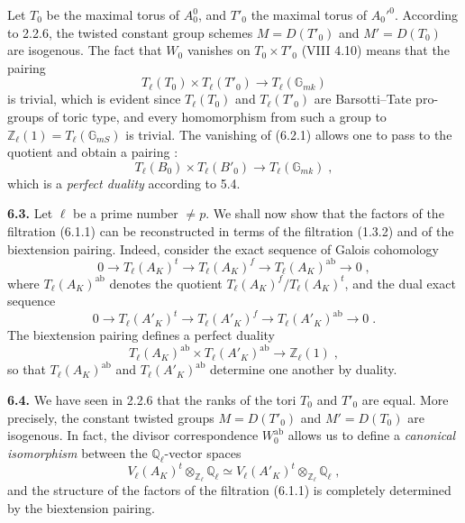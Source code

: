 \documentclass[11pt]{article}
\newcommand{\ZZ}{\mathbb Z}
\newcommand{\QQ}{\mathbb Q}
\newcommand{\GG}{\mathbb G}
\newcommand{\Tl}{T_{\ell}}
\newcommand{\ab}{\mathrm{ab}}
\begin{document}
Let $T_0$ be the maximal torus of $A_0^0$, and $T'_0$ the maximal torus
of $A_0'^0$. According to 2.2.6, the twisted constant group schemes
$M = D(T'_0)$ and $M' = D(T_0)$ are isogenous. The fact that $W_0$
vanishes on $T_0 \times T'_0$ (VIII 4.10) means that the pairing
\begin{equation}
\Tl(T_0) \times \Tl(T'_0) \longrightarrow \Tl(\GG_{mk})
\end{equation}
is trivial, which is evident since $\Tl(T_0)$ and $\Tl(T'_0)$ are
Barsotti--Tate pro-groups of toric type, and every homomorphism from
such a group to $\ZZ_{\ell}(1) = \Tl(\GG_{mS})$ is trivial. The
vanishing of (6.2.1) allows one to pass to the quotient and obtain a
pairing :
\begin{equation}
\Tl(B_0) \times \Tl(B'_0) \longrightarrow \Tl(\GG_{mk}) \; ,
\end{equation}
which is a \emph{perfect duality} according to 5.4.

\medskip

\noindent\textbf{6.3.} Let $\ell$ be a prime number $\neq p$. We shall
now show that the factors of the filtration (6.1.1) can be
reconstructed in terms of the filtration (1.3.2) and of the biextension
pairing. Indeed, consider the exact sequence of Galois cohomology
\begin{equation}
0 \longrightarrow \Tl(A_K)^t \longrightarrow \Tl(A_K)^f
\longrightarrow \Tl(A_K)^{\ab} \longrightarrow 0 \; ,
\end{equation}
where $\Tl(A_K)^{\ab}$ denotes the quotient
$\Tl(A_K)^f/\Tl(A_K)^t$, and the dual exact sequence
\begin{equation}
0 \longrightarrow \Tl(A'_K)^t \longrightarrow \Tl(A'_K)^f
\longrightarrow \Tl(A'_K)^{\ab} \longrightarrow 0 \; .
\end{equation}
The biextension pairing defines a perfect duality
\begin{equation}
\Tl(A_K)^{\ab} \times \Tl(A'_K)^{\ab} \longrightarrow
\ZZ_{\ell}(1) \; ,
\end{equation}
so that $\Tl(A_K)^{\ab}$ and $\Tl(A'_K)^{\ab}$ determine one another by
duality.

\medskip

\noindent\textbf{6.4.} We have seen in 2.2.6 that the ranks of the tori
$T_0$ and $T'_0$ are equal. More precisely, the constant twisted groups
$M = D(T'_0)$ and $M' = D(T_0)$ are isogenous. In fact, the divisor
correspondence $W_0^{\ab}$ allows us to define a \emph{canonical
isomorphism} between the $\QQ_{\ell}$-vector spaces
\begin{equation}
V_{\ell}(A_K)^t \otimes_{\ZZ_{\ell}} \QQ_{\ell} \simeq
V_{\ell}(A'_K)^t \otimes_{\ZZ_{\ell}} \QQ_{\ell} \; ,
\end{equation}
and the structure of the factors of the filtration (6.1.1) is completely
determined by the biextension pairing.
\end{document}
